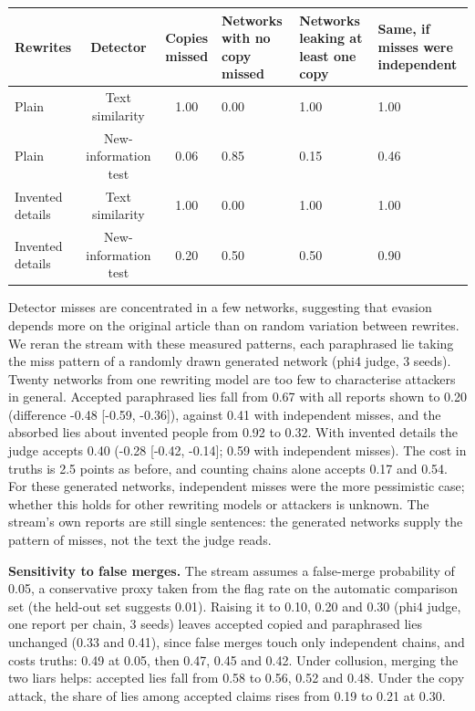 \begin{table}[htbp]\centering\footnotesize
\begin{tabularx}{\linewidth}{lccZZZ}
\toprule
Rewrites & Detector & Copies missed & Networks with no copy missed & Networks leaking at least one copy & Same, if misses were independent \\
\midrule
Plain & Text similarity & 1.00 & 0.00 & 1.00 & 1.00 \\
Plain & New-information test & 0.06 & 0.85 & 0.15 & 0.46 \\
Invented details & Text similarity & 1.00 & 0.00 & 1.00 & 1.00 \\
Invented details & New-information test & 0.20 & 0.50 & 0.50 & 0.90 \\
\bottomrule
\end{tabularx}
\end{table}

Detector misses are concentrated in a few networks, suggesting that evasion depends more on the original article than on random variation between rewrites. We reran the stream with these measured patterns, each paraphrased lie taking the miss pattern of a randomly drawn generated network (phi4 judge, 3 seeds). Twenty networks from one rewriting model are too few to characterise attackers in general. Accepted paraphrased lies fall from 0.67 with all reports shown to 0.20 (difference -0.48 {[}-0.59, -0.36{]}), against 0.41 with independent misses, and the absorbed lies about invented people from 0.92 to 0.32. With invented details the judge accepts 0.40 (-0.28 {[}-0.42, -0.14{]}; 0.59 with independent misses). The cost in truths is 2.5 points as before, and counting chains alone accepts 0.17 and 0.54. For these generated networks, independent misses were the more pessimistic case; whether this holds for other rewriting models or attackers is unknown. The stream's own reports are still single sentences: the generated networks supply the pattern of misses, not the text the judge reads.

\textbf{Sensitivity to false merges.} The stream assumes a false-merge probability of 0.05, a conservative proxy taken from the flag rate on the automatic comparison set (the held-out set suggests 0.01). Raising it to 0.10, 0.20 and 0.30 (phi4 judge, one report per chain, 3 seeds) leaves accepted copied and paraphrased lies unchanged (0.33 and 0.41), since false merges touch only independent chains, and costs truths: 0.49 at 0.05, then 0.47, 0.45 and 0.42. Under collusion, merging the two liars helps: accepted lies fall from 0.58 to 0.56, 0.52 and 0.48. Under the copy attack, the share of lies among accepted claims rises from 0.19 to 0.21 at 0.30.

